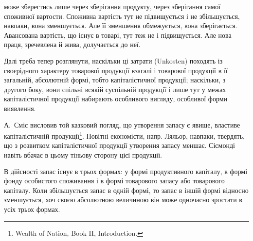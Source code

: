 \parcont{}  %
може зберегтись лише через зберігання продукту, через зберігання самої
споживної вартости. Споживна вартість тут не підвищується і не збільшується,
навпаки, вона зменшується. Але її зменшення обмежується,
вона зберігається. Авансована вартість, що існує в товарі, тут теж не
і підвищується. Але нова праця, зречевлена й жива, долучається до неї.

Далі треба тепер розглянути, наскільки ці затрати (Unkosten)
походять із своєрідного характеру товарової продукції взагалі і товарової
продукції в її загальній, абсолютній формі, тобто капіталістичної продукції;
наскільки, з другого боку, вони спільні всякій суспільній продукції і
лише тут у межах капіталістичної продукції набирають особливого вигляду,
особливої форми виявлення.

А.~Сміс висловив той казковий погляд, що утворення запасу є явище,
властиве капіталістичній продукції\footnote{
Wealth of Nation, Book II, Introduction.
}. Новітні економісти, напр. Ляльор,
навпаки, твердять, що з розвитком капіталістичної продукції утворення запасу
меншає. Сісмонді навіть вбачає в цьому тіньову сторону цієї продукції.

В дійсності запас існує в трьох формах: у формі продуктивного
капіталу, в формі фонду особистого споживання і в формі товарового
запасу або товарового капіталу. Коли збільшується запас в одній формі,
то запас в іншій формі відносно зменшується, хоч своєю абсолютною
величиною він може одночасно зростати в усіх трьох формах.

